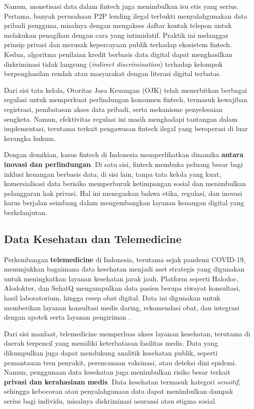 Namun, monetisasi data dalam fintech juga menimbulkan isu etis yang serius. Pertama, banyak perusahaan P2P lending ilegal terbukti menyalahgunakan data pribadi pengguna, misalnya dengan mengakses daftar kontak telepon untuk melakukan penagihan dengan cara yang intimidatif. Praktik ini melanggar prinsip privasi dan merusak kepercayaan publik terhadap ekosistem fintech. Kedua, algoritma penilaian kredit berbasis data digital dapat menghasilkan diskriminasi tidak langsung (\textit{indirect discrimination}) terhadap kelompok berpenghasilan rendah atau masyarakat dengan literasi digital terbatas.  

Dari sisi tata kelola, Otoritas Jasa Keuangan (OJK) telah menerbitkan berbagai regulasi untuk memperkuat perlindungan konsumen fintech, termasuk kewajiban registrasi, pembatasan akses data pribadi, serta mekanisme penyelesaian sengketa. Namun, efektivitas regulasi ini masih menghadapi tantangan dalam implementasi, terutama terkait pengawasan fintech ilegal yang beroperasi di luar kerangka hukum.  

Dengan demikian, kasus fintech di Indonesia memperlihatkan dinamika \textbf{antara inovasi dan perlindungan}. Di satu sisi, fintech membuka peluang besar bagi inklusi keuangan berbasis data; di sisi lain, tanpa tata kelola yang kuat, komersialisasi data berisiko memperburuk ketimpangan sosial dan menimbulkan pelanggaran hak privasi. Hal ini menegaskan bahwa etika, regulasi, dan inovasi harus berjalan seimbang dalam mengembangkan layanan keuangan digital yang berkelanjutan.

\subsection{Data Kesehatan dan Telemedicine}

Perkembangan \textbf{telemedicine} di Indonesia, terutama sejak pandemi COVID-19, menunjukkan bagaimana data kesehatan menjadi aset strategis yang digunakan untuk meningkatkan layanan kesehatan jarak jauh. Platform seperti Halodoc, Alodokter, dan SehatQ mengumpulkan data pasien berupa riwayat konsultasi, hasil laboratorium, hingga resep obat digital. Data ini digunakan untuk memberikan layanan konsultasi medis daring, rekomendasi obat, dan integrasi dengan apotek serta layanan pengiriman \cite{ristevski2018}.  

Dari sisi manfaat, telemedicine memperluas akses layanan kesehatan, terutama di daerah terpencil yang memiliki keterbatasan fasilitas medis. Data yang dikumpulkan juga dapat mendukung analitik kesehatan publik, seperti pemantauan tren penyakit, perencanaan vaksinasi, atau deteksi dini epidemi. Namun, penggunaan data kesehatan juga menimbulkan risiko besar terkait \textbf{privasi dan kerahasiaan medis}. Data kesehatan termasuk kategori \textit{sensitif}, sehingga kebocoran atau penyalahgunaan data dapat menimbulkan dampak serius bagi individu, misalnya diskriminasi asuransi atau stigma sosial.  

